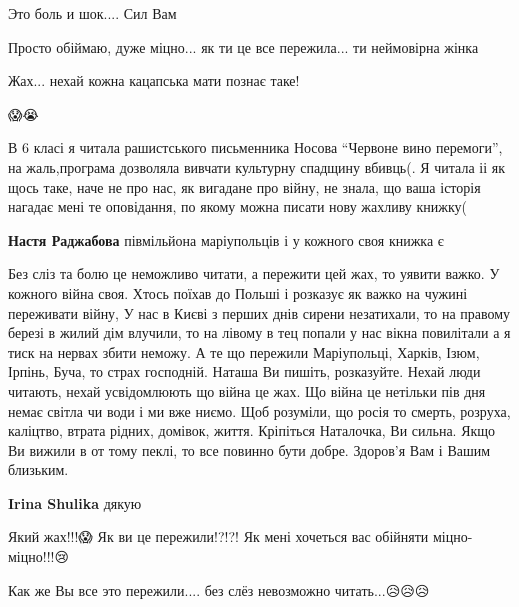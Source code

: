 
Это боль и шок.... Сил Вам🙏🙏🙏


Просто обіймаю, дуже міцно... як ти це все пережила... ти неймовірна жінка 🩷


Жах... нехай кожна кацапська мати познає таке!


😱😭


В 6 класі я читала рашистського письменника Носова \enquote{Червоне вино перемоги}, на
жаль,програма дозволяла вивчати культурну спадщину вбивць(. Я читала іі як щось
таке, наче не про нас, як вигадане про війну, не знала, що ваша історія нагадає
мені те оповідання, по якому можна писати нову жахливу книжку(

\begin{itemize} %
\textbf{Настя Раджабова} півмільйона маріупольців і у кожного своя книжка є
\end{itemize} %


Без сліз та болю це неможливо читати, а пережити цей жах, то уявити важко. У
кожного війна своя. Хтось поїхав до Польші і розказує як важко на чужині
переживати війну, У нас в Києві з перших днів сирени незатихали, то на правому
березі в жилий дім влучили, то на лівому в тец попали у нас вікна повилітали а
я тиск на нервах збити неможу. А те що пережили Маріупольці, Харків,
Ізюм, Ірпінь, Буча, то страх господній. Наташа Ви пишіть, розказуйте. Нехай люди
читають, нехай усвідомлюють що війна це жах. Що війна це нетільки пів дня немає
світла чи води і ми вже ниємо. Щоб розуміли, що росія то смерть, розруха,
каліцтво, втрата рідних, домівок, життя. Кріпіться Наталочка, Ви сильна. Якщо Ви
вижили в от тому пеклі, то все повинно бути добре. Здоров'я Вам і Вашим
близьким.

\begin{itemize} %
\textbf{Irina Shulika} дякую
\end{itemize} %


Який жах!!!😱 Як ви це пережили!?!?! Як мені хочеться вас обійняти
міцно-міцно!!!😢👐


Как же Вы все это пережили.... без слёз невозможно читать...😥😥😥

